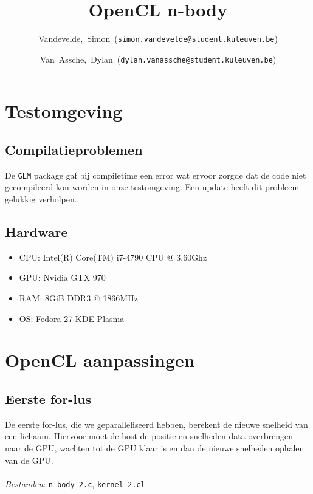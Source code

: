 \documentclass{article}
\title{OpenCL n-body}
\author{Vandevelde,~Simon~(\texttt{simon.vandevelde@student.kuleuven.be})
  \and
  Van~Assche,~Dylan~(\texttt{dylan.vanassche@student.kuleuven.be})}
\begin{document}
\maketitle %

\section{Testomgeving}
\subsection{Compilatieproblemen}

De \texttt{GLM} package gaf bij compiletime een error wat
ervoor zorgde dat de code niet gecompileerd kon worden in onze testomgeving.
Een update heeft dit probleem gelukkig verholpen.

\subsection{Hardware}
\begin{itemize}
    \item CPU: Intel(R) Core(TM) i7-4790 CPU @ 3.60Ghz
    \item GPU: Nvidia GTX 970
    \item RAM: 8GiB DDR3 @ 1866MHz
    \item OS: Fedora 27 KDE Plasma
\end{itemize}

\section{OpenCL aanpassingen}
\subsection{Eerste for-lus}
\label{hfd:niet-atomisch-for1}
De eerste for-lus, die we geparalleliseerd hebben, berekent de nieuwe snelheid van een lichaam.
Hiervoor moet de host de positie en snelheden data overbrengen naar de GPU, wachten tot de GPU
klaar is en dan de nieuwe snelheden ophalen van de GPU.
\\
\\
\textit{Bestanden}: \texttt{n-body-2.c}, \texttt{kernel-2.cl}
\end{document}
